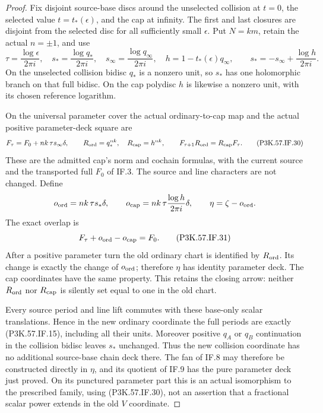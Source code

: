 \begin{proof}
Fix disjoint source-base discs around the unselected collision at \(t=0\),
the selected value \(t=t_*(\epsilon)\), and the cap at infinity. The first
and last closures are disjoint from the selected disc for all sufficiently
small \(\epsilon\). Put \(N=km\), retain the actual \(n=\pm1\), and use
\[
 \tau=\frac{\log\epsilon}{2\pi i},\quad
 s_*=\frac{\log q_*}{2\pi i},\quad
 s_\infty=\frac{\log q_\infty}{2\pi i},\quad
 h=1-t_*(\epsilon)q_\infty,\qquad
 s_*=-s_\infty+\frac{\log h}{2\pi i}.                   \tag{P3K.57.IF.29}
\]
On the unselected collision bidisc \(q_*\) is a nonzero unit, so \(s_*\)
has one holomorphic branch on that full bidisc. On the cap polydisc \(h\)
is likewise a nonzero unit, with its chosen reference logarithm.

On the universal parameter cover the actual ordinary-to-cap map and
the actual positive parameter-deck square are
\[
 F_\tau=F_0+nk\,\tau s_\infty\delta,\qquad
 R_{\rm ord}=q_*^{nk},\quad R_{\rm cap}=h^{nk},\qquad
 F_{\tau+1}R_{\rm ord}=R_{\rm cap}F_\tau.               \tag{P3K.57.IF.30}
\]
These are the admitted cap's norm and cochain formulas, with the current
source and the transported full \(F_0\) of IF.3. The source and line
characters are not changed. Define
\[
 o_{\rm ord}=nk\,\tau s_*\delta,\qquad
 o_{\rm cap}=nk\,\tau\frac{\log h}{2\pi i}\delta,\qquad
 \eta=\zeta-o_{\rm ord}.
\]
The exact overlap is
\[
                F_\tau+o_{\rm ord}-o_{\rm cap}=F_0.    \tag{P3K.57.IF.31}
\]
After a positive parameter turn the old ordinary chart is identified
by \(R_{\rm ord}\). Its change is exactly the change of \(o_{\rm ord}\);
therefore \(\eta\) has identity parameter deck. The cap coordinates
have the same property. This retains the closing arrow: neither
\(R_{\rm ord}\) nor \(R_{\rm cap}\) is silently set equal to one in
the old chart.

Every source period and line lift commutes with these base-only scalar
translations. Hence in the new ordinary coordinate the full periods
are exactly (P3K.57.IF.15), including all their units. Moreover positive
\(q_A\) or \(q_B\) continuation in the collision bidisc leaves \(s_*\)
unchanged. Thus the new collision coordinate has no additional
source-base chain deck there. The fan of IF.8 may therefore be
constructed directly in \(\eta\), and its quotient of IF.9 has the
pure parameter deck just proved. On its punctured parameter part
this is an actual isomorphism to the prescribed family, using
(P3K.57.IF.30), not an assertion that a fractional scalar power extends in
the old \(V\) coordinate.


\end{proof}
